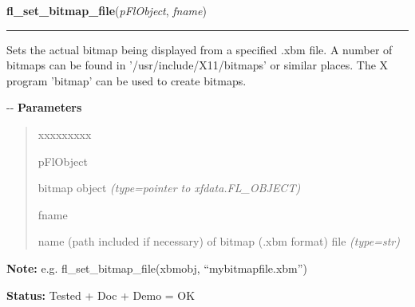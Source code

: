     \label{xformslib:flbitmap:fl_set_bitmap_file}

    \vspace{0.5ex}

\hspace{.8\funcindent}\begin{boxedminipage}{\funcwidth}

    \raggedright \textbf{fl\_set\_bitmap\_file}(\textit{pFlObject}, \textit{fname})

    \vspace{-1.5ex}

    \rule{\textwidth}{0.5\fboxrule}
\setlength{\parskip}{2ex}

Sets the actual bitmap being displayed from a specified .xbm file. A
number of bitmaps can be found in '/usr/include/X11/bitmaps' or similar
places. The X program 'bitmap' can be used to create bitmaps.

-{}-
\setlength{\parskip}{1ex}
      \textbf{Parameters}
      \vspace{-1ex}

      \begin{quote}
        \begin{Ventry}{xxxxxxxxx}

          \item[pFlObject]


bitmap object
            {\it (type=pointer to xfdata.FL\_OBJECT)}

          \item[fname]


name (path included if necessary) of bitmap (.xbm format) file
            {\it (type=str)}

        \end{Ventry}

      \end{quote}

\textbf{Note:} 
e.g. fl\_set\_bitmap\_file(xbmobj, ``mybitmapfile.xbm'')


\textbf{Status:} 
Tested + Doc + Demo = OK


    \end{boxedminipage}

    \label{xformslib:flbitmap:fl_set_bitmap_file}

